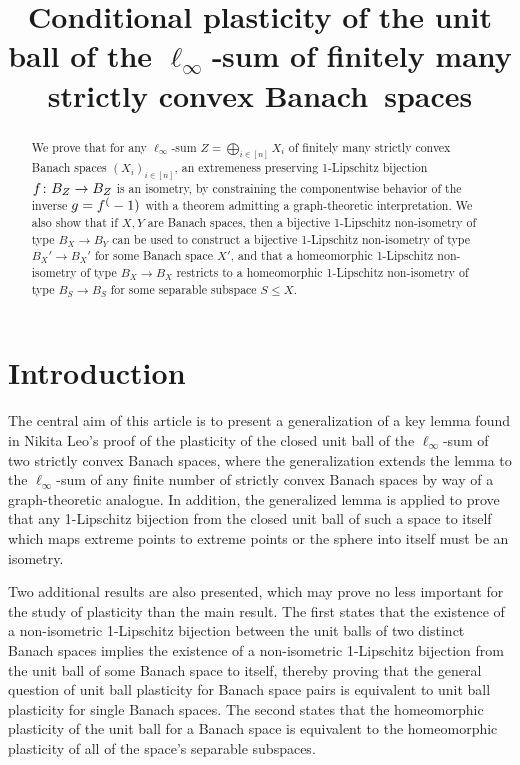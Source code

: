 \documentclass{amsart}
\title{Conditional plasticity of the unit ball of the \(\ell_\infty\)‑sum of finitely many strictly convex Banach~spaces}
\theoremstyle{definition}
\begin{document}
\begin{abstract}
    We prove that for any $\ell_\infty$-sum $Z = \bigoplus_{i \in [n]} X_i$ of finitely many strictly
    convex Banach spaces $(X_i)_{i \in [n]}$, an extremeness preserving 1-Lipschitz bijection
    $f\colon B_Z \to B_Z$ is an isometry, by constraining the componentwise behavior of the inverse
    $g=f^(-1)$ with a theorem admitting a graph-theoretic interpretation.
    We also show that if $X, Y$ are Banach spaces, then a bijective 1-Lipschitz non-isometry of
    type $B_X \to B_Y$ can be used to construct a bijective 1-Lipschitz non-isometry of type
    $B_X' \to B_X'$ for some Banach space $X'$, and that a homeomorphic 1-Lipschitz non-isometry of
    type $B_X \to B_X$ restricts to a homeomorphic 1-Lipschitz non-isometry of type
    $B_S \to B_S$ for some separable subspace $S \leq X$.
\end{abstract}

\maketitle

\section{Introduction}

The central aim of this article is to present a generalization of a key lemma
found in Nikita Leo's proof of the plasticity of the closed unit ball of
the $\ell_\infty$-sum of two strictly convex Banach spaces, where the generalization
extends the lemma to the $\ell_\infty$-sum of any finite number of strictly convex Banach
spaces by way of a graph-theoretic analogue. In addition, the generalized lemma is applied to prove that any 1-Lipschitz bijection from
the closed unit ball of such a space to itself
which maps extreme points to extreme points
or the sphere into itself must be an isometry.

Two additional results are also presented, which may prove no less important for the study of plasticity than the main result. The first states that the existence of a non-isometric 1-Lipschitz bijection between the unit balls of two distinct Banach spaces implies the existence of a non-isometric 1-Lipschitz bijection from the unit ball of some Banach space to itself, thereby proving that the general question of unit ball plasticity for Banach space pairs is equivalent to unit ball plasticity for single Banach spaces. The second states that the homeomorphic plasticity of the unit ball for a Banach space is equivalent to the homeomorphic plasticity of all of the space's separable subspaces.
\end{document}
